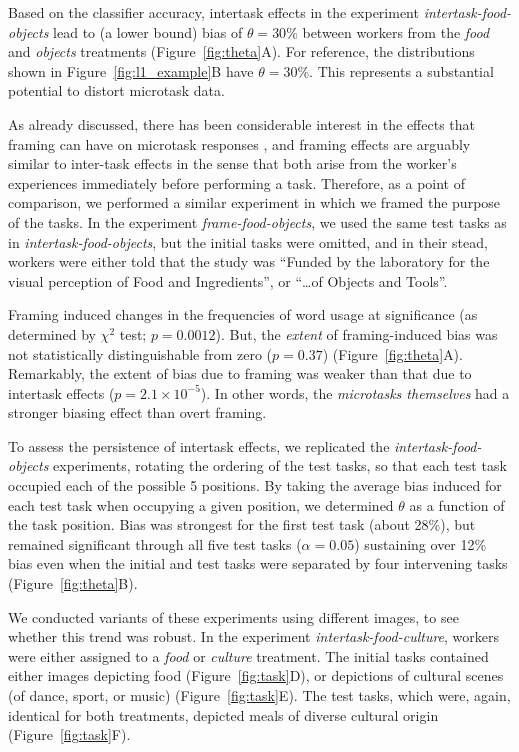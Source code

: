 \documentclass{sigchi}
\begin{document}
Based on the classifier accuracy, intertask effects in the 
experiment \textit{intertask-food-objects}
lead to (a lower bound) bias of $\theta=30\%$ between workers from the 
\textit{food} and \textit{objects} treatments (Figure~\ref{fig:theta}A).
For reference, the distributions shown in 
Figure~\ref{fig:l1_example}B have $\theta = 30\%$.  This represents a 
substantial potential to distort microtask data.

As already discussed, there has been considerable interest in the 
effects that framing can have on microtask responses
\cite{Kinnaird2012281,chandler2013breaking,thibodeau2013natural}, and 
framing effects are arguably similar to inter-task effects in the sense 
that both arise from the worker's experiences immediately before 
performing a task.
Therefore, as a point of comparison, we performed a similar experiment 
in which we framed the purpose of the tasks.  In the experiment 
\textit{frame-food-objects}, we used the same test tasks as in 
\textit{intertask-food-objects}, but the initial tasks were omitted, 
and in their stead, workers were either told that the study was 
``Funded by the laboratory for the 
visual perception of Food and Ingredients'', 
or ``\ldots of Objects and Tools''.  

Framing induced changes in the frequencies of 
word usage at significance 
(as determined by $\chi^2$ test; $p=0.0012$).  But, 
the \textit{extent} of framing-induced bias was not statistically 
distinguishable from zero ($p =0.37$) (Figure~\ref{fig:theta}A).
Remarkably, the extent of bias due to framing was weaker than that 
due to intertask effects ($p=2.1\times 10^{-5}$).
In other words, the \textit{microtasks themselves}
had a stronger biasing effect than overt framing.

To assess the persistence of intertask effects, we replicated the 
\textit{intertask-food-objects} experiments, rotating the ordering of the
test tasks, so that each test task occupied each of the possible 5 
positions.  By taking the average bias induced for each test task when 
occupying a given position, we determined $\theta$ as a function of the 
task position.
Bias was strongest for the first test task (about 28\%), 
but remained significant through all five test tasks 
($\alpha=0.05$) sustaining over 12\% bias even when the initial and test 
tasks were separated by four intervening tasks (Figure~\ref{fig:theta}B).

We conducted variants of these experiments using different images, to see 
whether this trend was robust.  In the experiment 
\textit{intertask-food-culture},
workers were either assigned to a \textit{food} or \textit{culture} treatment.
The initial tasks contained either images 
depicting food (Figure~\ref{fig:task}D), or depictions of cultural scenes 
(of dance, sport, or music) (Figure~\ref{fig:task}E).  The test tasks, which 
were, again, identical for both treatments, depicted meals of diverse 
cultural origin
(Figure~\ref{fig:task}F).  
\end{document}

